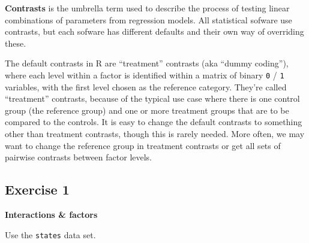 \documentclass[
]{book}
\newenvironment{Shaded}{\begin{snugshade}}{\end{snugshade}}
\newcommand{\CommentTok}[1]{\textcolor[rgb]{0.56,0.35,0.01}{\textit{#1}}}
\newcommand{\DataTypeTok}[1]{\textcolor[rgb]{0.13,0.29,0.53}{#1}}
\newcommand{\DecValTok}[1]{\textcolor[rgb]{0.00,0.00,0.81}{#1}}
\newcommand{\KeywordTok}[1]{\textcolor[rgb]{0.13,0.29,0.53}{\textbf{#1}}}
\newcommand{\NormalTok}[1]{#1}
\newcommand{\OperatorTok}[1]{\textcolor[rgb]{0.81,0.36,0.00}{\textbf{#1}}}
\newcommand{\StringTok}[1]{\textcolor[rgb]{0.31,0.60,0.02}{#1}}
\begin{document}
\textbf{Contrasts} is the umbrella term used to describe the process of testing linear combinations of parameters from regression models.
All statistical sofware use contrasts, but each sofware has different defaults and their own way of overriding these.

The default contrasts in R are ``treatment'' contrasts (aka ``dummy coding''), where each level within a factor
is identified within a matrix of binary \texttt{0} / \texttt{1} variables, with the first level chosen as the reference category.
They're called ``treatment'' contrasts, because of the typical use case where there is one control group (the reference group)
and one or more treatment groups that are to be compared to the controls. It is easy to change the default contrasts to something
other than treatment contrasts, though this is rarely needed. More often, we may want to change the reference group in
treatment contrasts or get all sets of pairwise contrasts between factor levels.

\begin{Shaded}
\end{Shaded}

\hypertarget{exercise-1-1}{%
\subsection{Exercise 1}\label{exercise-1-1}}

\textbf{Interactions \& factors}

Use the \texttt{states} data set.
\end{document}
